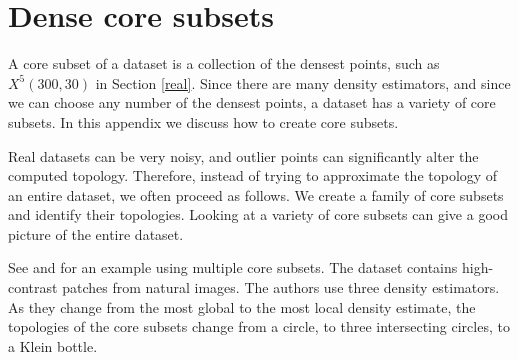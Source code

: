 \documentclass[amscd, amssymb, verbatim]{amsart}[12pt]
\theoremstyle{remark}
\theoremstyle{remark}
\theoremstyle{remark}
\begin{document}





\appendix
\appendixpage
\addappheadtotoc




\section{Dense core subsets}\label{A:core}

A core subset of a dataset is a collection of the densest points, such as $X^5(300,30)$ in Section \ref{real}. Since there are many density estimators, and since we can choose any number of the densest points, a dataset has a variety of core subsets. In this appendix we discuss how to create core subsets. 

Real datasets can be very noisy, and outlier points can significantly alter the computed topology. Therefore, instead of trying to approximate the topology of an entire dataset, we often proceed as follows. We create a family of core subsets and identify their topologies. Looking at a variety of core subsets can give a good picture of the entire dataset. 

See \citet{KleinBottle} and \citet{WitnessComplexes} for an example using multiple core subsets. The dataset contains high-contrast patches from natural images. The authors use three density estimators. As they change from the most global to the most local density estimate, the topologies of the core subsets change from a circle, to three intersecting circles, to a Klein bottle. 
\end{document}
